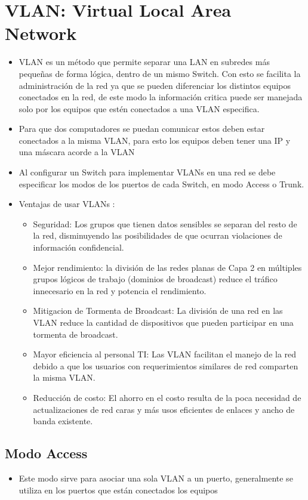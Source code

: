 \documentclass[spanish]{udpreport}
\begin{document}
\section{VLAN: Virtual Local Area Network}
\begin{itemize}
\item VLAN es un método que permite separar una LAN en subredes más pequeñas de forma lógica, dentro de un mismo Switch. Con esto se facilita la administración de la red ya que se pueden diferenciar los distintos equipos conectados en la red, de este modo la información critica puede ser manejada solo por los equipos que estén conectados a una VLAN especifica.
\item Para que dos computadores se puedan comunicar estos deben estar conectados a la misma VLAN, para esto los equipos deben tener una IP y una máscara acorde a la VLAN  %
\item Al configurar un Switch para implementar VLANs en una red se debe especificar los modos de los puertos de cada Switch, en modo Access o Trunk. %
\item Ventajas de usar VLANs :
\begin{itemize}
\item Seguridad: Los grupos que tienen datos sensibles se separan del resto de la red, disminuyendo las posibilidades de que ocurran violaciones de información confidencial.
\item Mejor rendimiento: la división de las redes planas de Capa 2 en múltiples grupos lógicos de trabajo (dominios de broadcast) reduce el tráfico innecesario en la red y potencia el rendimiento.
\item Mitigacion de Tormenta de Broadcast: La división de una red en las VLAN reduce la cantidad de dispositivos que pueden participar en una tormenta de broadcast.
\item Mayor eficiencia al personal TI: Las VLAN facilitan el manejo de la red debido a que los usuarios con requerimientos similares de red comparten la misma VLAN.
\item Reducción de costo: El ahorro en el costo resulta de la poca necesidad de actualizaciones de red caras y más usos eficientes de enlaces y ancho de banda existente.
\end{itemize}
\end{itemize}
\subsection{Modo Access}
\begin{itemize}
\item Este modo sirve para asociar una sola VLAN a un puerto, generalmente se utiliza en los puertos que están conectados los equipos
\end{itemize}
\end{document}

